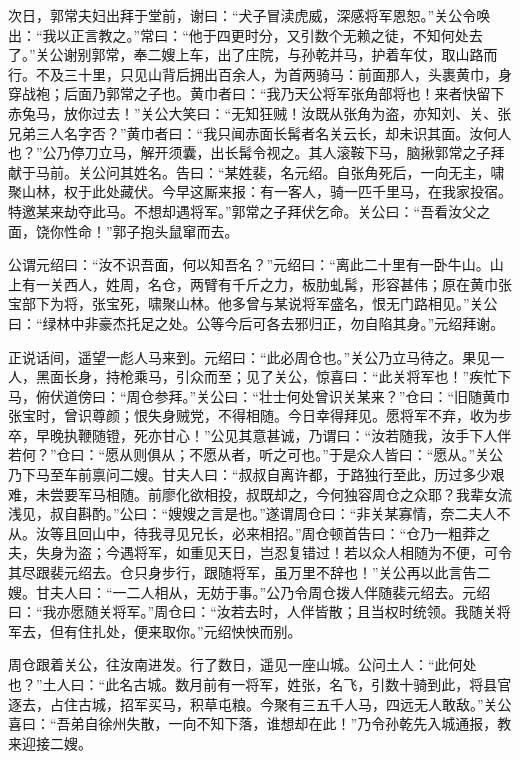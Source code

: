 次日，郭常夫妇出拜于堂前，谢曰：“犬子冒渎虎威，深感将军恩恕。”关公令唤出：“我以正言教之。”常曰：“他于四更时分，又引数个无赖之徒，不知何处去了。”关公谢别郭常，奉二嫂上车，出了庄院，与孙乾并马，护着车仗，取山路而行。不及三十里，只见山背后拥出百余人，为首两骑马：前面那人，头裹黄巾，身穿战袍；后面乃郭常之子也。黄巾者曰：“我乃天公将军张角部将也！来者快留下赤兔马，放你过去！”关公大笑曰：“无知狂贼！汝既从张角为盗，亦知刘、关、张兄弟三人名字否？”黄巾者曰：“我只闻赤面长髯者名关云长，却未识其面。汝何人也？”公乃停刀立马，解开须囊，出长髯令视之。其人滚鞍下马，脑揪郭常之子拜献于马前。关公问其姓名。告曰：“某姓裴，名元绍。自张角死后，一向无主，啸聚山林，权于此处藏伏。今早这厮来报：有一客人，骑一匹千里马，在我家投宿。特邀某来劫夺此马。不想却遇将军。”郭常之子拜伏乞命。关公曰：“吾看汝父之面，饶你性命！”郭子抱头鼠窜而去。

公谓元绍曰：“汝不识吾面，何以知吾名？”元绍曰：“离此二十里有一卧牛山。山上有一关西人，姓周，名仓，两臂有千斤之力，板肋虬髯，形容甚伟；原在黄巾张宝部下为将，张宝死，啸聚山林。他多曾与某说将军盛名，恨无门路相见。”关公曰：“绿林中非豪杰托足之处。公等今后可各去邪归正，勿自陷其身。”元绍拜谢。

正说话间，遥望一彪人马来到。元绍曰：“此必周仓也。”关公乃立马待之。果见一人，黑面长身，持枪乘马，引众而至；见了关公，惊喜曰：“此关将军也！”疾忙下马，俯伏道傍曰：“周仓参拜。”关公曰：“壮士何处曾识关某来？”仓曰：“旧随黄巾张宝时，曾识尊颜；恨失身贼党，不得相随。今日幸得拜见。愿将军不弃，收为步卒，早晚执鞭随镫，死亦甘心！”公见其意甚诚，乃谓曰：“汝若随我，汝手下人伴若何？”仓曰：“愿从则俱从；不愿从者，听之可也。”于是众人皆曰：“愿从。”关公乃下马至车前禀问二嫂。甘夫人曰：“叔叔自离许都，于路独行至此，历过多少艰难，未尝要军马相随。前廖化欲相投，叔既却之，今何独容周仓之众耶？我辈女流浅见，叔自斟酌。”公曰：“嫂嫂之言是也。”遂谓周仓曰：“非关某寡情，奈二夫人不从。汝等且回山中，待我寻见兄长，必来相招。”周仓顿首告曰：“仓乃一粗莽之夫，失身为盗；今遇将军，如重见天日，岂忍复错过！若以众人相随为不便，可令其尽跟裴元绍去。仓只身步行，跟随将军，虽万里不辞也！”关公再以此言告二嫂。甘夫人曰：“一二人相从，无妨于事。”公乃令周仓拨人伴随裴元绍去。元绍曰：“我亦愿随关将军。”周仓曰：“汝若去时，人伴皆散；且当权时统领。我随关将军去，但有住扎处，便来取你。”元绍怏怏而别。

周仓跟着关公，往汝南进发。行了数日，遥见一座山城。公问土人：“此何处也？”土人曰：“此名古城。数月前有一将军，姓张，名飞，引数十骑到此，将县官逐去，占住古城，招军买马，积草屯粮。今聚有三五千人马，四远无人敢敌。”关公喜曰：“吾弟自徐州失散，一向不知下落，谁想却在此！”乃令孙乾先入城通报，教来迎接二嫂。

